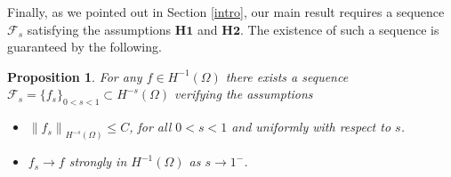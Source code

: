 \documentclass[reqno,twoside]{amsart}
\newtheorem{proposition}[theorem]{Proposition}
\numberwithin{equation}{section}
\newcommand{\norm}[2]{{\left\|#1\right\|}_{#2}}
\begin{document}
Finally, as we pointed out in Section \ref{intro}, our main result requires a sequence $\mathcal{F}_s$ satisfying the assumptions $\textbf{H1}$ and $\textbf{H2}$. The existence of such a sequence is guaranteed by the following.

\begin{proposition}\label{limit_f}
	For any $f\in H^{-1}(\Omega)$ there exists a sequence $\mathcal{F}_s=\{f_s\}_{0<s<1}\subset H^{-s}(\Omega)$ verifying the assumptions
	\begin{itemize}
		\item[$\textbf{H1}$] $\norm{f_s}{H^{-s}(\Omega)}\leq C$, for all $0<s<1$ and uniformly with respect to $s$.
		
		\item[$\widehat{\textbf{H2}}$] $f_s\to f$ strongly in $H^{-1}(\Omega)$ as $s\to 1^-$.
	\end{itemize}		
\end{proposition}
\end{document}
